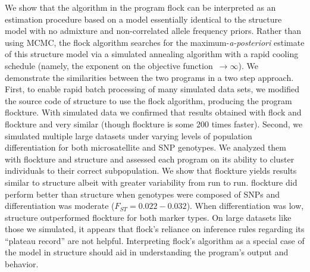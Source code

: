 
      We show that the algorithm in the program {\sc flock} \citep{Duc&Tur2009} can be
interpreted as an estimation procedure based on 
a model essentially identical to the {\sc structure} 
\citep{Pritchardetal2000} model with no admixture and non-correlated 
allele frequency priors. Rather than using MCMC, the {\sc flock} algorithm 
searches for the maximum-{\em a-posteriori}
estimate of this {\sc structure} model via a simulated 
annealing algorithm with a rapid cooling 
schedule (namely, the exponent on the objective function~$\rightarrow \infty$).  We 
demonstrate the similarities between the two programs in a two step approach. First,
to enable rapid batch processing of many simulated data sets,
we modified the source code of  {\sc structure} to use the {\sc flock} algorithm, producing
the program {\sc flockture}. With simulated data we confirmed that results obtained with
{\sc flock}  and {\sc flockture} and very similar (though flockture is some 200 times faster). 
Second, we simulated multiple large datasets under varying 
levels of population differentiation for both microsatellite and SNP genotypes. We analyzed them
with {\sc flockture} and {\sc structure} and assessed each program on its ability to cluster
individuals to their correct subpopulation.  We show that
{\sc flockture} yields results similar to {\sc structure} albeit with greater 
variability from run to run. {\sc flockture} did perform better than {\sc structure} 
when genotypes were composed of SNPs and differentiation was moderate 
($F_{ST}=0.022-0.032$). When differentiation was low, {\sc structure} outperformed {\sc flockture}
for both marker types. On large datasets like those we simulated, it appears that 
{\sc flock}'s reliance on inference rules regarding its ``plateau record'' are not helpful. 
Interpreting {\sc flock}'s algorithm as a special case of the model in 
{\sc structure} should aid in understanding the program's output and behavior. 

